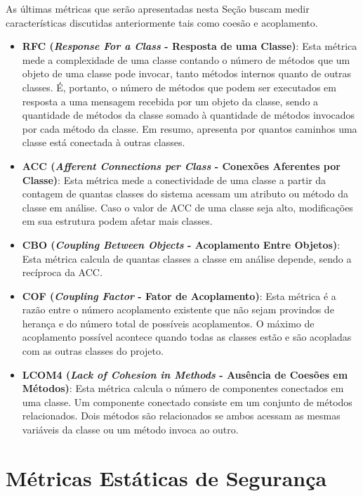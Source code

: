 %

As últimas métricas que serão apresentadas nesta Seção buscam medir características discutidas anteriormente tais como coesão e acoplamento.

%

\begin{itemize}
\item \textbf{RFC (\emph{Response For a Class} - Resposta de uma Classe)}: Esta métrica mede a complexidade de uma classe contando o número de métodos que um objeto de uma classe pode invocar, tanto métodos internos quanto de outras classes. É, portanto, o número de métodos que podem ser executados em resposta a uma mensagem recebida por um objeto da classe, sendo a quantidade de métodos da classe somado à quantidade de métodos invocados por cada método da classe. Em resumo, apresenta por quantos caminhos uma classe está conectada à outras classes.
\item \textbf{ACC (\emph{Afferent Connections per Class} - Conexões Aferentes por Classe)}: Esta métrica mede a conectividade de uma classe a partir da contagem de quantas classes do sistema acessam um atributo ou método da classe em análise. Caso o valor de ACC de uma classe seja alto, modificações em sua estrutura podem afetar mais classes.
\item \textbf{CBO (\emph{Coupling Between Objects} - Acoplamento Entre Objetos)}: Esta métrica calcula de quantas classes a classe em análise depende, sendo a recíproca da ACC.
\item \textbf{COF (\emph{Coupling Factor} - Fator de Acoplamento)}: Esta métrica é a razão entre o número acoplamento existente que não sejam provindos de herança e do número total de possíveis acoplamentos. O máximo de acoplamento possível acontece quando todas as classes estão e são acopladas com as outras classes do projeto.
\item \textbf{LCOM4 (\emph{Lack of Cohesion in Methods} - Ausência de Coesões em Métodos)}: Esta métrica calcula o número de componentes conectados em uma classe. Um componente conectado consiste em um conjunto de métodos relacionados. Dois métodos são relacionados se ambos acessam as mesmas variáveis da classe ou um método invoca ao outro.
\end{itemize}


\section{Métricas Estáticas de Segurança}
\label{subsec-security-metrics}

